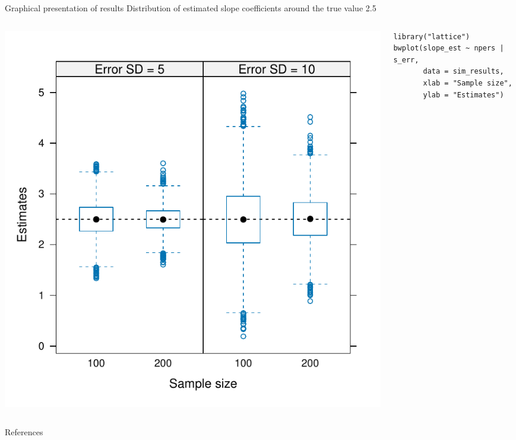 \documentclass[aspectratio=169]{beamer}
\begin{document}
\begin{frame}[fragile]{Graphical presentation of results}
  {Distribution of estimated slope coefficients around the true value 2.5}
  \begin{columns}
    \begin{column}{0.5\textwidth}
      \includegraphics[scale = .57]{../figures/boxplot_simstudy_example1}
    \end{column}
    \begin{column}{0.555\textwidth}
\begin{lstlisting}
library("lattice")
bwplot(slope_est ~ npers | s_err, 
       data = sim_results,
       xlab = "Sample size",
       ylab = "Estimates")
\end{lstlisting}
    \end{column}
  \end{columns}
\end{frame}

\appendix
\begin{frame}{References}


\end{frame}
\end{document}
